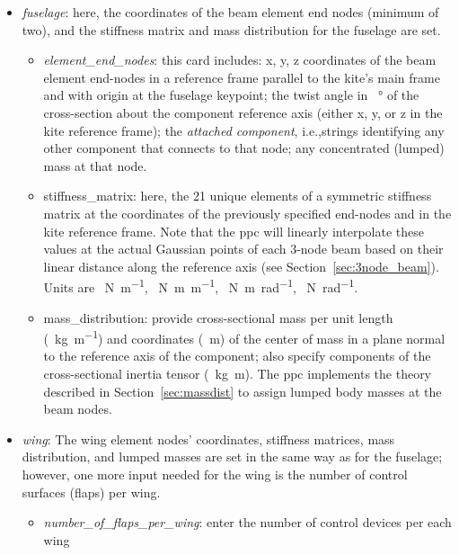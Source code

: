 \documentclass[report]{nrel}
\def\ie{i.e., }
\def\ie{i.e.,}
\begin{document}
\begin{itemize}
	\item \emph{fuselage}: here, the coordinates of the beam element end nodes (minimum of two), and the stiffness matrix and mass distribution for the fuselage are set.
	\begin{itemize}
		\item \emph{element\_end\_nodes}: this card includes: x, y, z coordinates of the beam element end-nodes in a reference frame parallel to the kite's main frame and with origin at the fuselage keypoint; the twist angle in \SI{}{\degree} of the cross-section about the component reference axis (either x, y, or z in the kite reference frame); the \emph{attached component}, \ie strings identifying any other component that connects to that node; any concentrated (lumped) mass at that node.
		\item {stiffness\_matrix}: here, the 21 unique elements of a symmetric stiffness matrix at the coordinates of the previously specified end-nodes and in the kite reference frame. Note that the \gls{ppc} will linearly interpolate these values at the actual Gaussian points of each 3-node beam based on their linear distance along the reference axis (see Section~\ref{sec:3node_beam}).  Units are \SI{}{\N\per\m}, \SI{}{\N\m\per\m}, \SI{}{\N\m\per\radian}, \SI{}{\N\per\radian}.
		\item {mass\_distribution}: provide cross-sectional mass per unit length (\SI{}{\kg\per\m}) and coordinates (\SI{}{\m}) of the center of mass in a plane normal to the reference axis of the component; also specify components of the cross-sectional inertia tensor (\SI{}{\kg\m}). The \gls{ppc} implements the theory described in Section~\ref{sec:massdist} to assign lumped body masses at the beam nodes.
		
	\end{itemize}

%
	\item \emph{wing}: The wing element nodes' coordinates, stiffness matrices, mass distribution, and lumped masses are set in the same way as for the fuselage; however, one more input  needed for the wing is the number of control surfaces (flaps) per wing.
		\begin{itemize}
			\item \emph{number\_of\_flaps\_per\_wing}: enter the number of control devices per each wing
	

\end{itemize}
\end{itemize}
\end{document}
